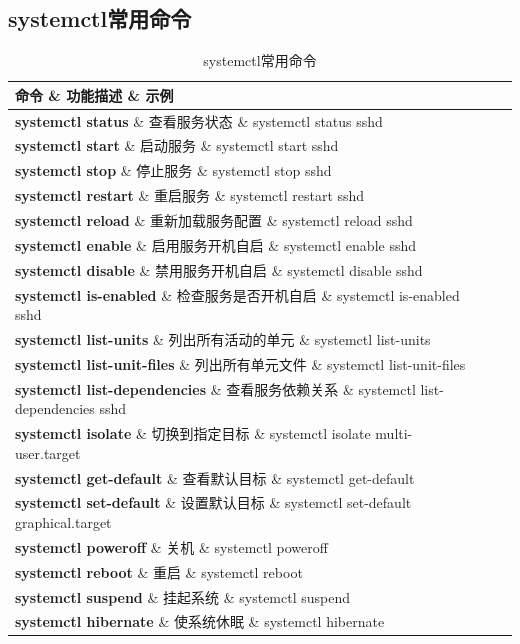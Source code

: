 \documentclass[12pt,UTF8]{ctexbook}
\begin{document}
\subsection{systemctl常用命令}
\begin{table}[htbp]
    \centering
    \begin{tabularx}{\textwidth}{|X|X|X|}
        \hline
        \textbf{命令} \& \textbf{功能描述} \& \textbf{示例} \\
        \hline
        \textbf{systemctl status} \& 查看服务状态 \& systemctl status sshd \\
        \hline
        \textbf{systemctl start} \& 启动服务 \& systemctl start sshd \\
        \hline
        \textbf{systemctl stop} \& 停止服务 \& systemctl stop sshd \\
        \hline
        \textbf{systemctl restart} \& 重启服务 \& systemctl restart sshd \\
        \hline
        \textbf{systemctl reload} \& 重新加载服务配置 \& systemctl reload sshd \\
        \hline
        \textbf{systemctl enable} \& 启用服务开机自启 \& systemctl enable sshd \\
        \hline
        \textbf{systemctl disable} \& 禁用服务开机自启 \& systemctl disable sshd \\
        \hline
        \textbf{systemctl is-enabled} \& 检查服务是否开机自启 \& systemctl is-enabled sshd \\
        \hline
        \textbf{systemctl list-units} \& 列出所有活动的单元 \& systemctl list-units \\
        \hline
        \textbf{systemctl list-unit-files} \& 列出所有单元文件 \& systemctl list-unit-files \\
        \hline
        \textbf{systemctl list-dependencies} \& 查看服务依赖关系 \& systemctl list-dependencies sshd \\
        \hline
        \textbf{systemctl isolate} \& 切换到指定目标 \& systemctl isolate multi-user.target \\
        \hline
        \textbf{systemctl get-default} \& 查看默认目标 \& systemctl get-default \\
        \hline
        \textbf{systemctl set-default} \& 设置默认目标 \& systemctl set-default graphical.target \\
        \hline
        \textbf{systemctl poweroff} \& 关机 \& systemctl poweroff \\
        \hline
        \textbf{systemctl reboot} \& 重启 \& systemctl reboot \\
        \hline
        \textbf{systemctl suspend} \& 挂起系统 \& systemctl suspend \\
        \hline
        \textbf{systemctl hibernate} \& 使系统休眠 \& systemctl hibernate \\
        \hline
    \end{tabularx}
    \caption{systemctl常用命令}
    \label{tab:systemctl\_commands}
\end{table}
\end{document}
